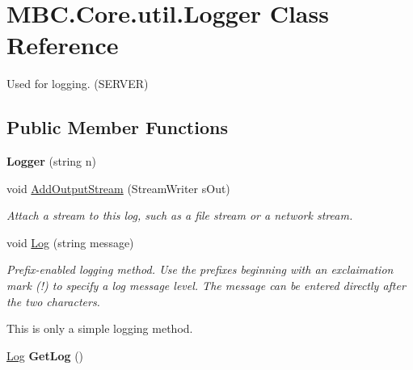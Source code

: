 \hypertarget{class_m_b_c_1_1_core_1_1util_1_1_logger}{\section{M\-B\-C.\-Core.\-util.\-Logger Class Reference}
\label{class_m_b_c_1_1_core_1_1util_1_1_logger}
}


Used for logging. (S\-E\-R\-V\-E\-R) 


\subsection*{Public Member Functions}
\begin{DoxyCompactItemize}
\item 
\hypertarget{class_m_b_c_1_1_core_1_1util_1_1_logger_ac2fdea5c1750f1dbc63fefde8bb0e12f}{{\bfseries Logger} (string n)}\label{class_m_b_c_1_1_core_1_1util_1_1_logger_ac2fdea5c1750f1dbc63fefde8bb0e12f}

\item 
\hypertarget{class_m_b_c_1_1_core_1_1util_1_1_logger_a21316aef85df8eb5decf285c50badfdc}{void \hyperlink{class_m_b_c_1_1_core_1_1util_1_1_logger_a21316aef85df8eb5decf285c50badfdc}{Add\-Output\-Stream} (Stream\-Writer s\-Out)}\label{class_m_b_c_1_1_core_1_1util_1_1_logger_a21316aef85df8eb5decf285c50badfdc}

\begin{DoxyCompactList}\small\item\em Attach a stream to this log, such as a file stream or a network stream.\end{DoxyCompactList}\item 
void \hyperlink{class_m_b_c_1_1_core_1_1util_1_1_logger_a9dbb38c93a6869f689516e8f3854981d}{Log} (string message)
\begin{DoxyCompactList}\small\item\em Prefix-\/enabled logging method. Use the prefixes beginning with an exclaimation mark (!) to specify a log message level. The message can be entered directly after the two characters.\par
 This is only a simple logging method.\par
 \end{DoxyCompactList}\item 
\hypertarget{class_m_b_c_1_1_core_1_1util_1_1_logger_a476ec92a5b5ea865e384fb04be6481dc}{\hyperlink{class_m_b_c_1_1_core_1_1util_1_1_log}{Log} {\bfseries Get\-Log} ()}\label{class_m_b_c_1_1_core_1_1util_1_1_logger_a476ec92a5b5ea865e384fb04be6481dc}


\end{DoxyCompactItemize}
